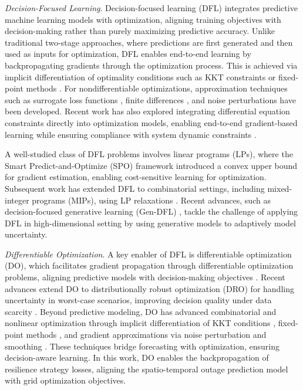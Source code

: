 \vspace{.05in}
\noindent\emph{Decision-Focused Learning}.
Decision-focused learning (DFL) integrates predictive machine learning models with optimization, aligning training objectives with decision-making rather than purely maximizing predictive accuracy. Unlike traditional two-stage approaches, where predictions are first generated and then used as inputs for optimization, DFL enables end-to-end learning by backpropagating gradients through the optimization process. This is achieved via implicit differentiation of optimality conditions such as KKT constraints \cite{amos2017optnet, gould2021deep} or fixed-point methods \cite{kotary2023folded, wilder2019end}. For nondifferentiable optimizations, approximation techniques such as surrogate loss functions \cite{elmachtoub_smart_2022}, finite differences \cite{vlastelica2019differentiation}, and noise perturbations \cite{berthet2020learning} have been developed. Recent work has also explored integrating differential equation constraints directly into optimization models, enabling end-to-end gradient-based learning while ensuring compliance with system dynamic constraints \cite{Fioretto:ICLR25, jacquillat2024branch}.

A well-studied class of DFL problems involves linear programs (LPs), where the Smart Predict-and-Optimize (SPO) framework \cite{elmachtoub_smart_2022} introduced a convex upper bound for gradient estimation, enabling cost-sensitive learning for optimization. Subsequent work has extended DFL to combinatorial settings, including mixed-integer programs (MIPs), using LP relaxations \cite{mandi2020smart, wilder2019melding}. 
Recent advances, such as decision-focused generative learning (Gen-DFL) \cite{wang2025gendfldecisionfocusedgenerativelearning}, tackle the challenge of applying DFL in high-dimensional setting by using generative models to adaptively model uncertainty.

\vspace{.05in}
\noindent\emph{Differentiable Optimization}.
A key enabler of DFL is differentiable optimization (DO), which facilitates gradient propagation through differentiable optimization problems, aligning predictive models with decision-making objectives \cite{cvx}. Recent advances extend DO to distributionally robust optimization (DRO) for handling uncertainty in worst-case scenarios, improving decision quality under data scarcity \cite{zhu2022distributionally, chen2025uncertainty}. Beyond predictive modeling, DO has advanced combinatorial and nonlinear optimization through implicit differentiation of KKT conditions \cite{amos2017optnet}, fixed-point methods \cite{kotary2023folded}, and gradient approximations via noise perturbation \cite{berthet2020learning} and smoothing \cite{vlastelica2019differentiation}. These techniques bridge forecasting with optimization, ensuring decision-aware learning. In this work, DO enables the backpropagation of resilience strategy losses, aligning the spatio-temporal outage prediction model with grid optimization objectives.